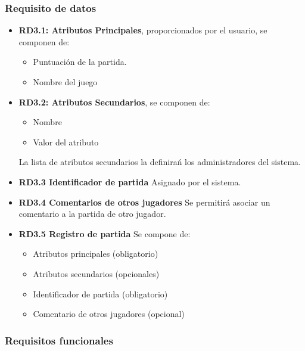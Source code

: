 \subsubsection{Requisito de datos}

\begin{itemize}
	\item \textbf{RD3.1: Atributos Principales}, proporcionados por el usuario, se componen de:
	\begin{itemize}
		\item Puntuación de la partida.
		\item Nombre del juego
	\end{itemize}

	\item \textbf{RD3.2: Atributos Secundarios}, se componen de:
	\begin{itemize}
		\item Nombre
		\item Valor del atributo
	\end{itemize}
	La lista de atributos secundarios la definirań los administradores del sistema.

	\item \textbf{RD3.3 Identificador de partida} Asignado por el sistema.

	\item \textbf{RD3.4 Comentarios de otros jugadores} Se permitirá asociar un comentario a la partida de otro jugador.

	\item \textbf{RD3.5 Registro de partida} Se compone de:
	\begin{itemize}
		\item Atributos principales (obligatorio)
		\item Atributos secundarios (opcionales)
		\item Identificador de partida (obligatorio)
		\item Comentario de otros jugadores (opcional)
	\end{itemize}

\end{itemize}



\subsubsection{Requisitos funcionales}

